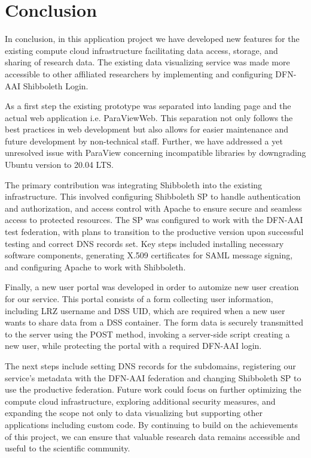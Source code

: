 \chapter{Conclusion}\label{chapter:conclusion}

In conclusion, in this application project we have developed new features for
the existing compute cloud infrastructure facilitating data access, storage, and
sharing of research data. The existing data visualizing service was made more
accessible to other affiliated researchers by implementing and configuring
DFN-AAI Shibboleth Login.

As a first step the existing prototype was separated into landing page and the
actual web application i.e. ParaViewWeb. This separation not only follows the
best practices in web development but also allows for easier maintenance and
future development by non-technical staff. Further, we have addressed a yet
unresolved issue with ParaView concerning incompatible libraries by downgrading
Ubuntu version to 20.04 LTS.

The primary contribution was integrating Shibboleth into the existing
infrastructure. This involved configuring Shibboleth SP to handle authentication
and authorization, and access control with Apache to ensure secure and seamless
access to protected resources. The SP was configured to work with the DFN-AAI
test federation, with plans to transition to the productive version upon
successful testing and correct DNS records set. Key steps included installing
necessary software components, generating X.509 certificates for SAML message
signing, and configuring Apache to work with Shibboleth.

Finally, a new user portal was developed in order to automize new user creation
for our service. This portal consists of a form collecting user information,
including LRZ username and DSS UID, which are required when a new user wants to
share data from a DSS container. The form data is securely transmitted to the
server using the POST method, invoking a server-side script creating a new user,
while protecting the portal with a required DFN-AAI login.

The next steps include setting DNS records for the subdomains, registering our
service's metadata with the DFN-AAI federation and changing Shibboleth SP to use
the productive federation. Future work could focus on further optimizing the
compute cloud infrastructure, exploring additional security measures, and
expanding the scope not only to data visualizing but supporting other
applications including custom code. By continuing to build on the achievements
of this project, we can ensure that valuable research data remains accessible
and useful to the scientific community.
